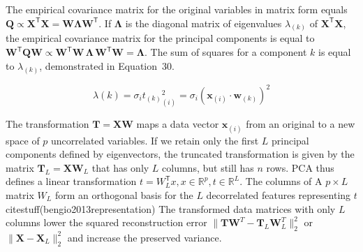 \documentclass[preprint,12pt]{elsarticle}
\begin{document}
The empirical covariance matrix for the original variables in matrix form equals $\mathbf{Q} \propto \mathbf{X}^{\mathsf{T}}\mathbf{X} =\mathbf{W} \mathbf{\Lambda} \mathbf{W}^{\mathsf{T}}$. If $\mathbf{\Lambda}$ is the diagonal matrix of eigenvalues $\lambda_{\left(k\right)}$ of $\mathbf{X}^{\mathsf{T}}\mathbf{X}$, the empirical covariance matrix for the principal components is equal to $\mathbf{W}^{\mathsf{T}}\mathbf{Q} \mathbf{W} \propto \mathbf{W}^{\mathsf{T}}\mathbf{W} \,\mathbf{\Lambda} \,\mathbf{W}^{\mathsf{T}}\mathbf{W} =\mathbf{\Lambda}$. The sum of squares for a component $k$ is equal to $\lambda_{\left(k\right)}$, demonstrated in Equation~30.

\begin{equation}
	\lambda(k) = \sigma_{i} {t_{\left(k\right)}}^{2}_{\left(i\right)} = \sigma_{i} {\left(\mathbf{x}_{\left(i\right)} \cdot \mathbf{w}_{\left(k\right)}\right)}^{2}
	\label{eqn:30}
\end{equation}

The transformation $\mathbf{T} = \mathbf{X} \mathbf{W}$ maps a data vector $\mathbf{x}_{\left(i\right)}$ from an original to a new space of $p$ uncorrelated variables. If we retain only the first $L$ principal components defined by eigenvectors, the truncated transformation is given by the matrix $\mathbf{T}_{L}=\mathbf{X} \mathbf{W}_{L}$ that has only $L$ columns, but still has $n$ rows. PCA thus defines a linear transformation $t=W_{L}^{\mathsf{T}}x,x\in \mathbb{R}^{p},t\in \mathbb{R}^{L}$. The columns of A $p \times L$ matrix $W_{L}$ form an orthogonal basis for the $L$ decorrelated features representing $t$ citestuff(bengio2013representation) The transformed data matrices with only $L$ columns lower the squared reconstruction error $\|\mathbf{T} \mathbf{W}^{T}-\mathbf{T}_{L}\mathbf{W}_{L}^{T}\|_{2}^{2}$ or  $\|\mathbf{X} -\mathbf{X}_{L}\|_{2}^{2}$ and increase the preserved variance.
\end{document}
